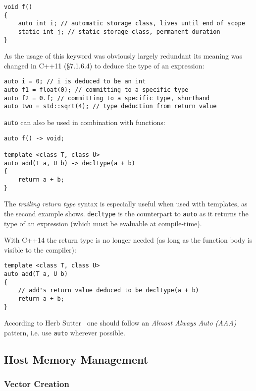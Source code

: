 \begin{lstlisting}
void f()
{
    auto int i; // automatic storage class, lives until end of scope
    static int j; // static storage class, permanent duration
}
\end{lstlisting}

As the usage of this keyword was obviously largely redundant its meaning was changed in C++11 \cite{cpp11std}(§7.1.6.4) to deduce the type of an expression:

\begin{lstlisting}
auto i = 0; // i is deduced to be an int
auto f1 = float(0); // committing to a specific type
auto f2 = 0.f; // committing to a specific type, shorthand
auto two = std::sqrt(4); // type deduction from return value
\end{lstlisting}

\texttt{auto} can also be used in combination with functions:

\begin{lstlisting}
auto f() -> void;

template <class T, class U>
auto add(T a, U b) -> decltype(a + b)
{
    return a + b;
}
\end{lstlisting}

The \textit{trailing return type} syntax is especially useful when used with templates, as the second example shows. \texttt{decltype} is the counterpart to \texttt{auto} as it returns the type of an expression (which must be evaluable at compile-time).

With C++14 the return type is no longer needed (as long as the function body is visible to the compiler):

\begin{lstlisting}
template <class T, class U>
auto add(T a, U b)
{
    // add's return value deduced to be decltype(a + b)
    return a + b;
}
\end{lstlisting}

According to Herb Sutter~\cite{sutteraaa} one should follow an \textit{Almost Always Auto (AAA)} pattern, i.e. use \texttt{auto} wherever possible.

\subsection{Host Memory Management}

\subsubsection{Vector Creation}

